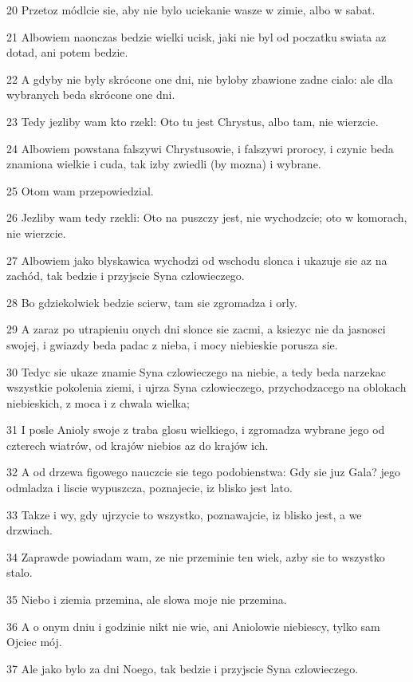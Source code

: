 \par 20 Przetoz módlcie sie, aby nie bylo uciekanie wasze w zimie, albo w sabat.
\par 21 Albowiem naonczas bedzie wielki ucisk, jaki nie byl od poczatku swiata az dotad, ani potem bedzie.
\par 22 A gdyby nie byly skrócone one dni, nie byloby zbawione zadne cialo: ale dla wybranych beda skrócone one dni.
\par 23 Tedy jezliby wam kto rzekl: Oto tu jest Chrystus, albo tam, nie wierzcie.
\par 24 Albowiem powstana falszywi Chrystusowie, i falszywi prorocy, i czynic beda znamiona wielkie i cuda, tak izby zwiedli (by mozna) i wybrane.
\par 25 Otom wam przepowiedzial.
\par 26 Jezliby wam tedy rzekli: Oto na puszczy jest, nie wychodzcie; oto w komorach, nie wierzcie.
\par 27 Albowiem jako blyskawica wychodzi od wschodu slonca i ukazuje sie az na zachód, tak bedzie i przyjscie Syna czlowieczego.
\par 28 Bo gdziekolwiek bedzie scierw, tam sie zgromadza i orly.
\par 29 A zaraz po utrapieniu onych dni slonce sie zacmi, a ksiezyc nie da jasnosci swojej, i gwiazdy beda padac z nieba, i mocy niebieskie porusza sie.
\par 30 Tedyc sie ukaze znamie Syna czlowieczego na niebie, a tedy beda narzekac wszystkie pokolenia ziemi, i ujrza Syna czlowieczego, przychodzacego na oblokach niebieskich, z moca i z chwala wielka;
\par 31 I posle Anioly swoje z traba glosu wielkiego, i zgromadza wybrane jego od czterech wiatrów, od krajów niebios az do krajów ich.
\par 32 A od drzewa figowego nauczcie sie tego podobienstwa: Gdy sie juz Gala? jego odmladza i liscie wypuszcza, poznajecie, iz blisko jest lato.
\par 33 Takze i wy, gdy ujrzycie to wszystko, poznawajcie, iz blisko jest, a we drzwiach.
\par 34 Zaprawde powiadam wam, ze nie przeminie ten wiek, azby sie to wszystko stalo.
\par 35 Niebo i ziemia przemina, ale slowa moje nie przemina.
\par 36 A o onym dniu i godzinie nikt nie wie, ani Aniolowie niebiescy, tylko sam Ojciec mój.
\par 37 Ale jako bylo za dni Noego, tak bedzie i przyjscie Syna czlowieczego.

